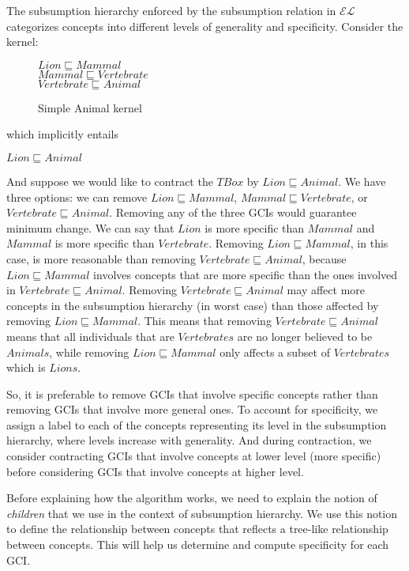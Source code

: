 The subsumption hierarchy enforced by the subsumption relation in $\mathcal{EL}$ categorizes concepts into different levels of generality and specificity. Consider the kernel:%
\begin{figure}[h]
\begin{center}
$Lion \sqsubseteq Mammal$\\
$Mammal \sqsubseteq Vertebrate$\\
$Vertebrate \sqsubseteq Animal$
\end{center}
\caption{Simple Animal kernel}
\label{fig:AnimalKernel}
\end{figure}


\begin{flushleft}
which implicitly entails
\end{flushleft}
\begin{center}
$Lion \sqsubseteq Animal$
\end{center}
And suppose we would like to contract the $TBox$ by $Lion \sqsubseteq Animal$. We have three options: we can remove $Lion \sqsubseteq Mammal$, $Mammal \sqsubseteq Vertebrate$, or $Vertebrate \sqsubseteq Animal$. Removing any of the three GCIs would guarantee minimum change. We can say that $Lion$ is more specific than $Mammal$ and $Mammal$ is more specific than $Vertebrate$. Removing $Lion \sqsubseteq Mammal$, in this case, is more reasonable than removing $Vertebrate \sqsubseteq Animal$, because $Lion \sqsubseteq Mammal$ involves concepts that are more specific than the ones involved in $Vertebrate \sqsubseteq Animal$. Removing $Vertebrate \sqsubseteq Animal$ may affect more concepts in the subsumption hierarchy (in worst case) than those affected by removing $Lion \sqsubseteq Mammal$. This means that removing $Vertebrate \sqsubseteq Animal$ means that all individuals that are $Vertebrates$ are no longer believed to be $Animals$, while removing $Lion \sqsubseteq Mammal$ only affects a subset of $Vertebrates$ which is $Lions$.

So, it is preferable to remove GCIs that involve specific concepts rather than removing GCIs that involve more general ones. To account for specificity, we assign a label to each of the concepts representing its level in the subsumption hierarchy, where levels increase with generality. And during contraction, we consider contracting GCIs that involve concepts at lower level (more specific) before considering GCIs that involve concepts at higher level.

Before explaining how the algorithm works, we need to explain the notion of \textit{children} that we use in the context of subsumption hierarchy. We use this notion to define the relationship between concepts that reflects a tree-like relationship between concepts. This will help us determine and compute specificity for each GCI.


